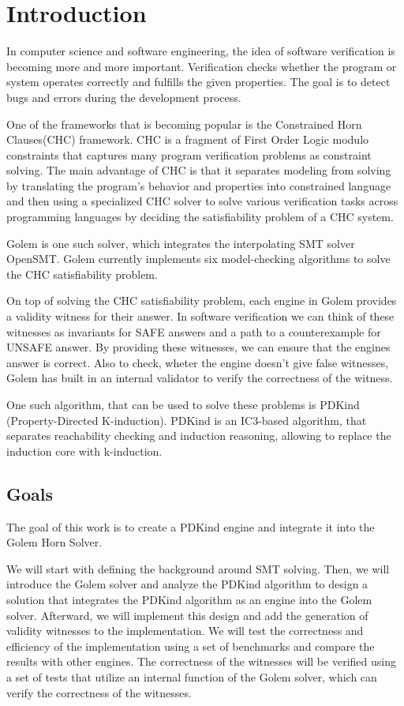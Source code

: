 \chapter{Introduction}

\noindent In computer science and software engineering, the idea of software verification is becoming more and more important. Verification checks whether the program or system operates correctly and fulfills the given properties. The goal is to detect bugs and errors during the development process.

One of the frameworks that is becoming popular is the Constrained Horn Clauses(CHC)\cite{10.1007/978-3-031-13185-1_2} framework. CHC is a fragment of First Order Logic modulo constraints that captures many program verification problems as constraint solving. The main advantage of CHC is that it separates modeling from solving by translating the program's behavior and properties into constrained language and then using a specialized CHC solver to solve various verification tasks across programming languages by deciding the satisfiability problem of a CHC system.

Golem\cite{blicha_golem_2023} is one such solver, which integrates the interpolating SMT solver OpenSMT\cite{10.1007/978-3-319-40970-2_35}. Golem currently implements six model-checking algorithms to solve the CHC satisfiability problem.

On top of solving the CHC satisfiability problem, each engine in Golem provides a validity witness for their answer. In software verification we can think of these witnesses as invariants for SAFE answers and a path to a counterexample for UNSAFE answer. By providing these witnesses, we can ensure that the engines answer is correct. Also to check, wheter the engine doesn't give false witnesses, Golem has built in an internal validator to verify the correctness of the witness. 

One such algorithm, that can be used to solve these problems is PDKind (Property-Directed K-induction)\cite{7886665}. PDKind is an IC3\cite{6148908}-based algorithm, that separates reachability checking and induction reasoning, allowing to replace the induction core with k-induction.

\section{Goals}
\noindent The goal of this work is to create a PDKind engine and integrate it into the Golem Horn Solver\cite{blicha_golem_2023}. 

We will start with defining the background around SMT solving. Then, we will introduce the Golem solver and analyze the PDKind algorithm to design a solution that integrates the PDKind algorithm as an engine into the Golem solver. Afterward, we will implement this design and add the generation of validity witnesses to the implementation. We will test the correctness and efficiency of the implementation using a set of benchmarks and compare the results with other engines. The correctness of the witnesses will be verified using a set of tests that utilize an internal function of the Golem solver, which can verify the correctness of the witnesses.

